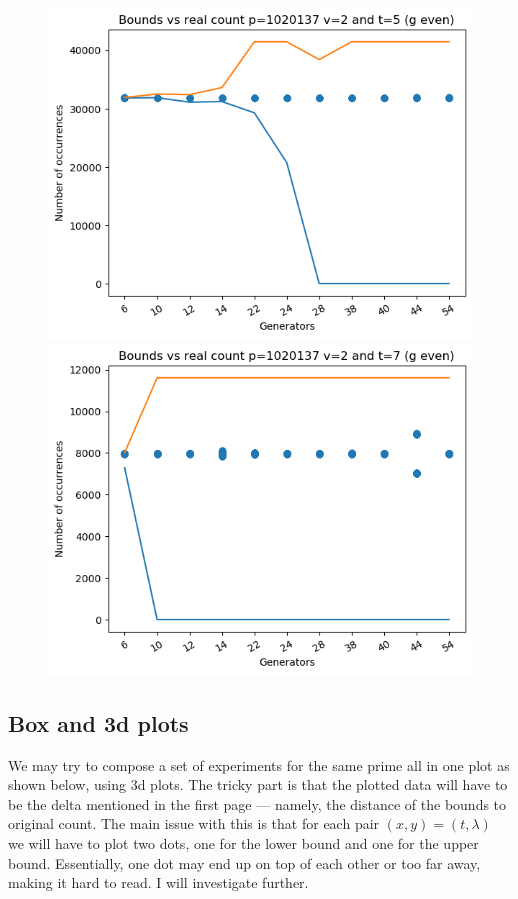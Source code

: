 \documentclass{article}
\begin{document}
\begin{figure}[H]
\begin{minipage}{.49\textwidth}
            \includegraphics[width=\textwidth]{../plots/tuples_figures/1020137v2geven/test_p1020137_v2_t5_g_even.png}
            \includegraphics[width=\textwidth]{../plots/tuples_figures/1020137v2geven/test_p1020137_v2_t7_g_even.png}
    \end{minipage}
\end{figure}

\subsection{Box and 3d plots}
We may try to compose a set of experiments for the same prime all in one plot as shown below, using 3d plots. The tricky part is that the plotted data will have to be the delta mentioned in the first page --- namely, the distance of the bounds to original count. The main issue with this is that for each pair $(x,y) = (t, \lambda)$ we will have to plot two dots, one for the lower bound and one for the upper bound. Essentially, one dot may end up on top of each other or too far away, making it hard to read. I will investigate further.
\end{document}
